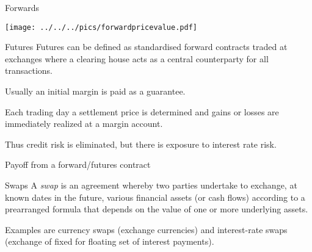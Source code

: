 Forwards
	\begin{center}
	\texttt{[image: ../../../pics/forwardpricevalue.pdf]}
	\end{center}


Futures
	Futures can be defined as standardised forward contracts traded at exchanges where a clearing house acts as a central counterparty for all transactions.
	
	Usually an initial margin is paid as a guarantee.
	
	Each trading day a settlement price is determined and gains or losses are immediately realized at a margin account.
	
	Thus credit risk is eliminated, but there is exposure to interest rate risk.


Payoff from a forward/futures contract
	\begin{figure}
		\centering
		 \qquad
	\end{figure}


Swaps
	A {\it swap} is an agreement whereby two parties
	undertake to exchange, at known dates in the future, various
	financial assets (or cash flows) according to a prearranged
	formula that depends on the value of one or more underlying
	assets. 

	Examples are currency swaps (exchange currencies) and
	interest-rate swaps (exchange of fixed for floating set of
	interest payments).
